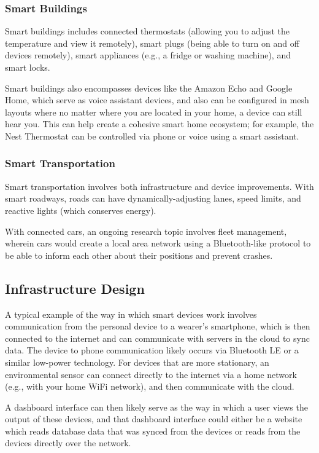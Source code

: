 \documentclass[twoside]{article}
\begin{document}
\subsubsection{Smart Buildings}
Smart buildings includes connected thermostats (allowing you to adjust the temperature and view it remotely), smart plugs (being able to turn on and off devices remotely), smart appliances (e.g., a fridge or washing machine), and smart locks. 

Smart buildings also encompasses devices like the Amazon Echo and Google Home, which serve as voice assistant devices, and also can be configured in mesh layouts where no matter where you are located in your home, a device can still hear you. This can help create a cohesive smart home ecosystem; for example, the Nest Thermostat can be controlled via phone or voice using a smart assistant.

\subsubsection{Smart Transportation}
Smart transportation involves both infrastructure and device improvements. With smart roadways, roads can have dynamically-adjusting lanes, speed limits, and reactive lights (which conserves energy). 

With connected cars, an ongoing research topic involves fleet management, wherein cars would create a local area network using a Bluetooth-like protocol to be able to inform each other about their positions and prevent crashes.

\subsection{Infrastructure Design}
A typical example of the way in which smart devices work involves communication from the personal device to a wearer's smartphone, which is then connected to the internet and can communicate with servers in the cloud to sync data. The device to phone communication likely occurs via Bluetooth LE or a similar low-power technology. For devices that are more stationary, an environmental sensor can connect directly to the internet via a home network (e.g., with your home WiFi network), and then communicate with the cloud.

A dashboard interface can then likely serve as the way in which a user views the output of these devices, and that dashboard interface could either be a website which reads database data that was synced from the devices or reads from the devices directly over the network.
\end{document}
